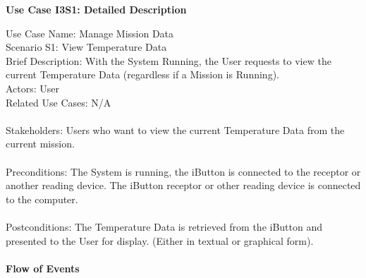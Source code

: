 \documentclass[letterpaper]{article}
\begin{document}
\noindent
\begin{center}
\textbf{Use Case I3S1:  Detailed Description}
\end{center}
Use Case Name: Manage Mission Data\\
Scenario S1:  View Temperature Data\\
Brief Description:  With the System Running, the User requests to view
the current Temperature Data (regardless if a Mission is Running).\\
Actors:  User\\
Related Use Cases:  N/A\\\\
Stakeholders:  Users who want to view the current Temperature Data from
the current mission.\\\\
Preconditions:  The System is running, the iButton is connected to the
receptor or another reading device.  The iButton receptor or other
reading device is connected to the computer.\\\\
Postconditions:  The Temperature Data is retrieved from the iButton and
presented to the User for display.  (Either in textual or graphical
form).\\\\
\textbf{Flow of Events}\\\\
\end{document}
